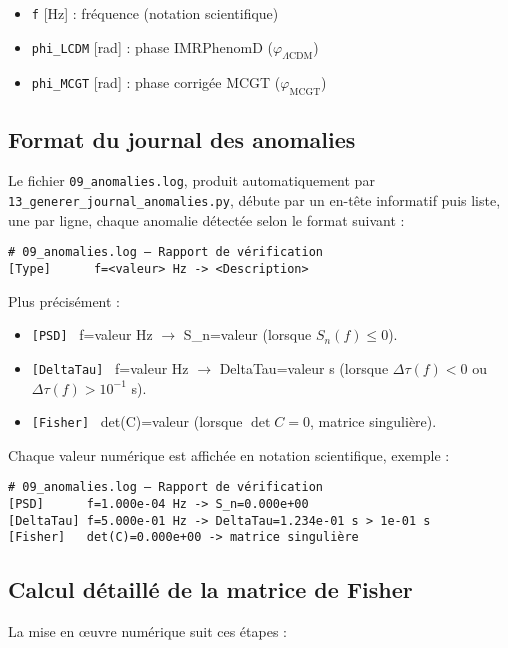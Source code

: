 \begin{itemize}
  \item \texttt{f} [Hz]         : fréquence (notation scientifique)
  \item \texttt{phi\_LCDM} [rad] : phase IMRPhenomD (\(\varphi_{\Lambda\mathrm{CDM}}\))
  \item \texttt{phi\_MCGT} [rad] : phase corrigée MCGT (\(\varphi_{\mathrm{MCGT}}\))
\end{itemize}

\subsection{Format du journal des anomalies}
Le fichier \texttt{09\_anomalies.log}, produit automatiquement par \texttt{13\_generer\_journal\_anomalies.py}, débute par un en-tête informatif puis liste, une par ligne, chaque anomalie détectée selon le format suivant :

\begin{verbatim}
# 09_anomalies.log – Rapport de vérification
[Type]      f=<valeur> Hz -> <Description>
\end{verbatim}

\noindent Plus précisément :
\begin{itemize}
  \item \texttt{[PSD]}      \, f=\<valeur\> Hz \(\to\) S\_n=\<valeur\>
        (lorsque \(S_{n}(f)\le 0\)).
  \item \texttt{[DeltaTau]} \, f=\<valeur\> Hz \(\to\) DeltaTau=\<valeur\> s
        (lorsque \(\Delta\tau(f)<0\) ou \(\Delta\tau(f)>10^{-1}\) s).
  \item \texttt{[Fisher]}   \, det(C)=\<valeur\>
        (lorsque \(\det C=0\), matrice singulière).
\end{itemize}

Chaque valeur numérique est affichée en notation scientifique, exemple :

\begin{verbatim}
# 09_anomalies.log – Rapport de vérification
[PSD]      f=1.000e-04 Hz -> S_n=0.000e+00
[DeltaTau] f=5.000e-01 Hz -> DeltaTau=1.234e-01 s > 1e-01 s
[Fisher]   det(C)=0.000e+00 -> matrice singulière
\end{verbatim}

\subsection{Calcul détaillé de la matrice de Fisher}
\label{subsec:details-fisher}
La mise en œuvre numérique suit ces étapes :

